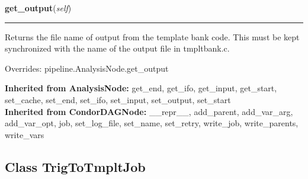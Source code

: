     \label{inspiral:TmpltBankNode:get_output}
    \vspace{0.5ex}

    \noindent\begin{boxedminipage}{\textwidth}

    \raggedright \textbf{get\_output}(\textit{self})

    \vspace{-1.5ex}

    \rule{\textwidth}{0.5\fboxrule}
    Returns the file name of output from the template bank code. This 
    must be kept synchronized with the name of the output file in 
    tmpltbank.c.

    \vspace{1ex}

      Overrides: pipeline.AnalysisNode.get\_output

    \end{boxedminipage}

  \noindent\textbf{Inherited from AnalysisNode:}
    get\_end,
    get\_ifo,
    get\_input,
    get\_start,
    set\_cache,
    set\_end,
    set\_ifo,
    set\_input,
    set\_output,
    set\_start
    \\
  \noindent\textbf{Inherited from CondorDAGNode:}
    \_\_repr\_\_,
    add\_parent,
    add\_var\_arg,
    add\_var\_opt,
    job,
    set\_log\_file,
    set\_name,
    set\_retry,
    write\_job,
    write\_parents,
    write\_vars


\subsection{Class TrigToTmpltJob}

